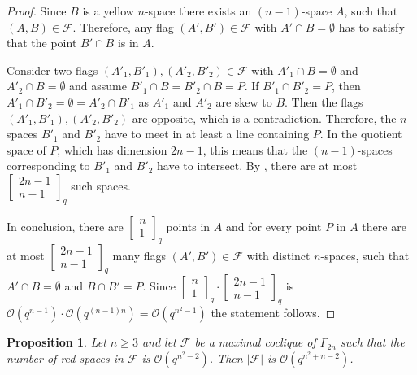 \documentclass[11pt, oneside, a4paper]{article}
\newtheorem{prop}[thm]{Proposition}
\newcommand{\EKR}{\mathcal{F}}
\newcommand{\OO}{\mathcal{O}}
\newcommand{\Gauss}[2]{{\begin{bmatrix} #1 \\ #2 \end{bmatrix}_q}}
\begin{document}
\begin{proof}
    Since $B$ is a yellow $n$-space there exists an $(n-1)$-space $A$, such that $(A,B)\in \EKR$. Therefore, any flag $(A',B')\in \EKR$ with $A'\cap B=\emptyset$ has to satisfy that the point $B'\cap B$ is in  $A$. 

    Consider two flags $(A'_1,B'_1),(A'_2,B'_2)\in \EKR$ with $A'_1\cap B=\emptyset$ and $A'_2\cap B=\emptyset$ and assume $B'_1\cap B=B'_2\cap B=P$.
    If $B'_1\cap B'_2=P$, then $A'_1\cap B'_2=\emptyset=A'_2\cap B'_1$ as $A'_1$ and $A'_2$ are skew to $B$. Then the flags $(A'_1,B'_1),(A'_2,B'_2)$ are opposite, which is a contradiction. Therefore, the $n$-spaces $B'_1$ and $B'_2$ have to meet in at least a line containing $P$.
    In the quotient space of $P$, which has dimension $2n-1$, this means that the $(n-1)$-spaces corresponding to $B'_1$ and $B'_2$ have to intersect. By , there are at most $\Gauss{2n-1}{n-1}$ such spaces.

    In conclusion, there are $\Gauss{n}{1}$ points in $A$ and for every point $P$ in $A$ there are at most $\Gauss{2n-1}{n-1}$ many flags $(A',B')\in \EKR$ with distinct $n$-spaces, such that $A'\cap B=\emptyset$ and $B\cap B'=P$. Since $\Gauss{n}{1}\cdot \Gauss{2n-1}{n-1}$ is $\OO(q^{n-1})\cdot \OO(q^{(n-1)n})=\OO(q^{n^2-1})$ the statement follows.
\end{proof}


\begin{prop}
Let $n\geq 3$ and let $\EKR$ be a maximal coclique of $\Gamma_{2n}$ such that the number of red spaces in $\EKR$ is $\OO(q^{n^2-2})$. Then $|\EKR|$ is $\OO(q^{n^2+n-2})$.
\end{prop}
\end{document}
